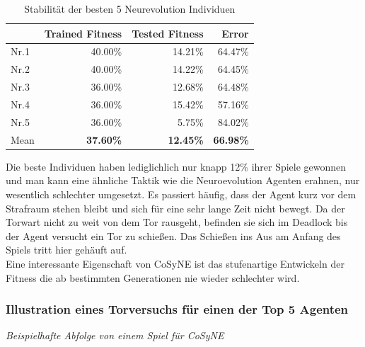                 \begin{table}[H]
                    \begin{center}
                    \begin{tabular}{ |l|r|r|r| } 
                        \hline
                        \hfill & Trained Fitness   & Tested Fitness  &          Error    \\ \hline
                          Nr.1 &          40.00\%  &         14.21\% &          64.47\%  \\  
                          Nr.2 &          40.00\%  &         14.22\% &          64.45\%  \\  
                          Nr.3 &          36.00\%  &         12.68\% &          64.48\%  \\ 
                          Nr.4 &          36.00\%  &         15.42\% &          57.16\%  \\ 
                          Nr.5 &          36.00\%  &          5.75\% &          84.02\%  \\ \hline
                          Mean &  \textbf{37.60\%} & \textbf{12.45\%} & \textbf{66.98\%}  \\ \hline
                    \end{tabular}
                    \end{center}
                    \caption{Stabilität der besten 5 Neurevolution Individuen \label{fig:neuroevotable}}
                \end{table}
                \noindent
                Die beste Individuen haben lediglichlich nur knapp 12\% ihrer Spiele gewonnen und man kann eine ähnliche Taktik wie die Neuroevolution Agenten erahnen, nur wesentlich schlechter umgesetzt. Es passiert häufig, dass der Agent kurz vor dem Strafraum stehen bleibt und sich für eine sehr lange Zeit nicht bewegt. Da der Torwart nicht zu weit von dem Tor rausgeht, befinden sie sich im Deadlock bis der Agent versucht ein Tor zu schießen. Das Schießen ins Aus am Anfang des Spiels tritt hier gehäuft auf.\\

                \noindent
                Eine interessante Eigenschaft von CoSyNE ist das stufenartige Entwickeln der Fitness die ab bestimmten Generationen nie wieder schlechter wird.

\newpage
                \subsubsection*{Illustration eines Torversuchs für einen der Top 5 Agenten}
                \begin{center} \textit{Beispielhafte Abfolge von einem Spiel für CoSyNE} \end{center}
\newpage

